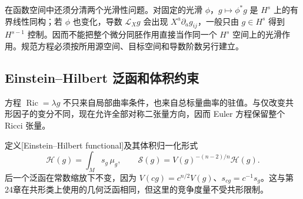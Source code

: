 在函数空间中还须分清两个光滑性问题。对固定的光滑 \(\phi\)，\(g\mapsto\phi^*g\) 是 \(H^s\) 上的有界线性同构；若 \(\phi\) 也变化，导数 \(\mathcal L_Xg\) 会出现 \(X^a\partial_ag_{ij}\)，一般只由 \(g\in H^s\) 得到 \(H^{s-1}\) 控制。因而不能把整个微分同胚作用直接当作同一个 \(H^s\) 空间上的光滑作用。规范方程必须按所用源空间、目标空间和导数阶数另行建立。

\subsection{Einstein–Hilbert 泛函和体积约束}
\label{g3:subsec:2501:04}
方程 \(\operatorname{Ric}=\lambda g\) 不只来自局部曲率条件，也来自总标量曲率的驻值。与仅改变共形因子的变分不同，现在允许全部对称二张量方向，因而 Euler 方程保留整个 Ricci 张量。

定义[Einstein--Hilbert functional]及其体积归一化形式
\begin{equation}\label{g3:eq:einstein-hilbert-functionals}
	\mathcal H(g)=\int_Ms_g\,\mu_g,\qquad
	\mathcal S(g)=V(g)^{-(n-2)/n}\mathcal H(g).
\end{equation}
后一个泛函在常数缩放下不变，因为 \(V(cg)=c^{n/2}V(g)\)、\(s_{cg}=c^{-1}s_g\)。这与第24章在共形类上使用的几何泛函相同，但这里的竞争度量不受共形限制。

